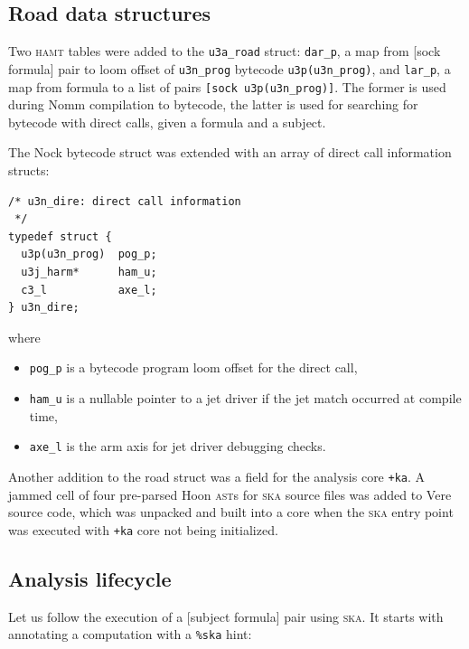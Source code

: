 \documentclass[twoside]{article}
\begin{document}
\subsection{Road data structures}

Two \textsc{hamt} tables were added to the \lstinline[style=inlinecode]{u3a_road} struct: \lstinline[style=inlinecode]{dar_p}, a map from [sock formula] pair to loom offset of \lstinline[style=inlinecode]{u3n_prog} bytecode \lstinline[style=inlinecode]{u3p(u3n_prog)}, and \lstinline[style=inlinecode]{lar_p}, a map from formula to a list of pairs \lstinline[style=inlinecode]{[sock u3p(u3n_prog)]}.  The former is used during Nomm compilation to bytecode, the latter is used for searching for bytecode with direct calls, given a formula and a subject.

The Nock bytecode struct was extended with an array of direct call information structs:

\begin{lstlisting}[style=listingcode_c]
/* u3n_dire: direct call information
 */
typedef struct {
  u3p(u3n_prog)  pog_p;
  u3j_harm*      ham_u;
  c3_l           axe_l;
} u3n_dire;
\end{lstlisting}

\noindent
where

\begin{itemize}
  \item \lstinline[style=inlinecode]{pog_p} is a bytecode program loom offset for the direct call,
  \item \lstinline[style=inlinecode]{ham_u} is a nullable pointer to a jet driver if the jet match occurred at compile time,
  \item \lstinline[style=inlinecode]{axe_l} is the arm axis for jet driver debugging checks.
\end{itemize}

\noindent\sloppy
Another addition to the road struct was a field for the \mbox{analysis} core \lstinline[style=inlinecode]{+ka}. A jammed cell of four pre-parsed Hoon \textsc{ast}s for \textsc{ska} source files was added to Vere source code, which was unpacked and built into a core when the \textsc{ska} entry point was executed with \lstinline[style=inlinecode]{+ka} core not being initialized.

\subsection{Analysis lifecycle}

Let us follow the execution of a [subject formula] pair using \textsc{ska}.  It starts with annotating a computation with a \lstinline[style=inlinecode]{%ska} hint:
\end{document}
